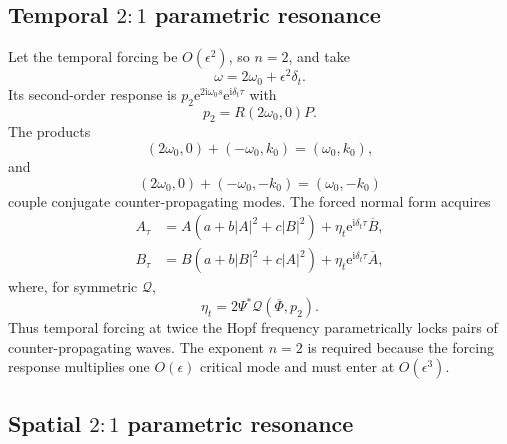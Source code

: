 \documentclass[11pt]{article}
\newcommand{\ii}{\mathrm{i}}
\newcommand{\ee}{\mathrm{e}}
\newcommand{\cQ}{\mathcal{Q}}
\begin{document}
\subsection{Temporal \texorpdfstring{$2{:}1$}{2:1} parametric resonance}

Let the temporal forcing be $O(\epsilon^2)$, so $n=2$, and take
\begin{equation}
  \omega=2\omega_0+\epsilon^2\delta_t.
\end{equation}
Its second-order response is
$p_2\ee^{2\ii\omega_0s}\ee^{\ii\delta_t\tau}$ with
\begin{equation}
  p_2=R(2\omega_0,0)P.
\end{equation}
The products
\begin{equation}
  (2\omega_0,0)+(-\omega_0,k_0)=(\omega_0,k_0),
\end{equation}
and
\begin{equation}
  (2\omega_0,0)+(-\omega_0,-k_0)=(\omega_0,-k_0)
\end{equation}
couple conjugate counter-propagating modes.  The forced normal form acquires
\begin{subequations}
\begin{align}
  A_\tau&=A(a+b|A|^2+c|B|^2)
  +\eta_t\ee^{\ii\delta_t\tau}\overline B,\\
  B_\tau&=B(a+b|B|^2+c|A|^2)
  +\eta_t\ee^{\ii\delta_t\tau}\overline A,
\end{align}
\end{subequations}
where, for symmetric $\cQ$,
\begin{equation}
  \eta_t=2\Psi^*\cQ(\overline\Phi,p_2).
  \label{eq:eta-time}
\end{equation}
Thus temporal forcing at twice the Hopf frequency parametrically locks pairs
of counter-propagating waves.  The exponent $n=2$ is required because the
forcing response multiplies one $O(\epsilon)$ critical mode and must enter at
$O(\epsilon^3)$.

\subsection{Spatial \texorpdfstring{$2{:}1$}{2:1} parametric resonance}
\end{document}
